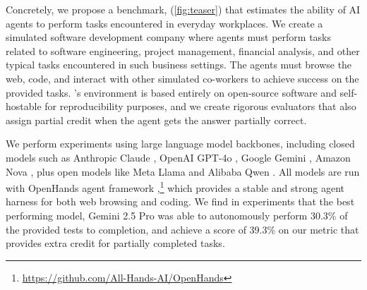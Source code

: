\documentclass{article}
\begin{document}

Concretely, we propose a benchmark, \emph{\tac} (\autoref{fig:teaser}) that estimates the ability of AI agents to perform tasks encountered in everyday workplaces.
We create a simulated software development company where agents must perform tasks related to software engineering, project management, financial analysis, and other typical tasks encountered in such business settings.
The agents must browse the web, code, and interact with other simulated co-workers to achieve success on the provided tasks.
\tac's environment is based entirely on open-source software and self-hostable for reproducibility purposes, and we create rigorous evaluators that also assign partial credit when the agent gets the answer partially correct.

We perform experiments using \nummodels large language model backbones, including closed models such as Anthropic Claude \citep{TheC3}, OpenAI GPT-4o \citep{gpt4o}, Google Gemini \citep{team2023gemini}, Amazon Nova \citep{amazon2024nova}, plus open models like Meta Llama \citep{dubey2024Llama} and Alibaba Qwen \citep{yang2024qwen2}.
All models are run with OpenHands agent framework \citep{wang2024openhandsopenplatformai},\footnote{\url{https://github.com/All-Hands-AI/OpenHands}} which provides a stable and strong agent harness for both web browsing and coding.
We find in experiments that the best performing model, Gemini 2.5 Pro was able to autonomously perform 30.3\% of the provided tests to completion, and achieve a score of 39.3\% on our metric that provides extra credit for partially completed tasks.
\end{document}
